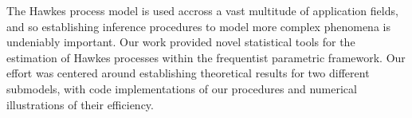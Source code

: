 


The Hawkes process model is used accross a vast multitude of application fields, and so establishing inference procedures to model more complex phenomena is undeniably important. 
Our work provided novel statistical tools for the estimation of Hawkes processes within the frequentist parametric framework.
Our effort was centered around establishing theoretical results for two different submodels, with code implementations of our procedures and numerical illustrations of their efficiency. 

\vspace{5mm}


